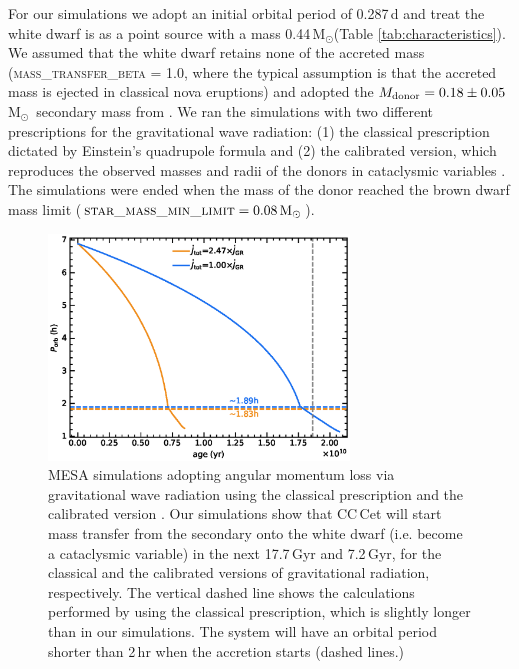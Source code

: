 \documentclass[fleqn,usenatbib]{mnras}
\newcommand{\Msun}{\mbox{$\mathrm{M}_{\odot}$}}
\newcommand{\bgc}[1]{\textcolor{orange}{[#1]}}
\begin{document}

For our simulations we adopt an initial orbital period of 0.287\,d and treat the white dwarf is as a point source with a mass 0.44\,\Msun (Table \ref{tab:characteristics}). We assumed that the white dwarf retains none of the accreted mass (\textsc{mass\_transfer\_beta} = 1.0, where the typical assumption is that the accreted mass is ejected in classical nova eruptions) and adopted the $M_{\rm donor}=0.18\pm0.05$\,\Msun\ secondary mass from \citet{safferetal93-1}. We ran the simulations with two different prescriptions for the gravitational wave radiation: (1) the classical prescription dictated by Einstein's quadrupole formula \citep{paczynski67-1} and (2) the calibrated version, which reproduces the observed masses and radii of the donors in cataclysmic variables \citep{kniggeetal11-1}. The simulations were ended when the mass of the donor reached the brown dwarf mass limit ($\mbox{\textsc{star\_mass\_min\_limit}}=0.08\,\Msun$).

\begin{figure}
    \centering
    \includegraphics[width=8cm]{Porb_age_v2.eps}
    \caption{MESA simulations adopting angular momentum loss via gravitational wave radiation using the classical prescription \citep[][blue]{paczynski67-1} and the calibrated version \citep[][ orange]{kniggeetal11-1}. Our simulations show that CC\,Cet will start mass transfer from the secondary onto the white dwarf (i.e. become a cataclysmic variable) in the next 17.7\,Gyr and 7.2\,Gyr, for the classical and the calibrated versions of gravitational radiation, respectively. The vertical dashed line shows the calculations performed by \citet{schreiber+gaensicke03-1} using the classical prescription, which is slightly longer than in our simulations. The system will have an orbital period shorter than 2\,hr when the accretion starts (dashed lines.) }
    \label{fig:MESA}
\end{figure}
\end{document}
